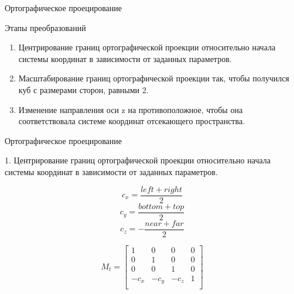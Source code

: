 \documentclass{beamer}
\begin{document}
	\begin{frame}{Ортографическое проецирование}
	
		Этапы преобразований
	\begin{enumerate}
		\item
		Центрирование границ ортографической проекции относительно начала системы координат в зависимости от заданных параметров.
		\item
		Масштабирование границ ортографической проекции так, чтобы получился куб с размерами сторон, равными 2.
		\item 
		Изменение направления оси z на противоположное, чтобы она соответствовала системе координат отсекающего пространства.
	\end{enumerate}



\end{frame}
	\begin{frame}{Ортографическое проецирование}
		
		1. Центрирование границ ортографической проекции относительно начала системы координат в зависимости от заданных параметров.

		\[
			c_x = \frac{left + right}{2}
		\]
		\[
			c_y = \frac{bottom + top}{2}
		\]
		\[
			c_z = - \frac{near + far}{2}
		\]

		\[
			M_t = 
			\begin{bmatrix}
				1 & 0 & 0 & 0 \\
				0 & 1 & 0 & 0 \\
				0 & 0 & 1 & 0 \\
				-c_x & -c_y & -c_z & 1 \\
			\end{bmatrix}	
		\]

	\end{frame}
\end{document}
